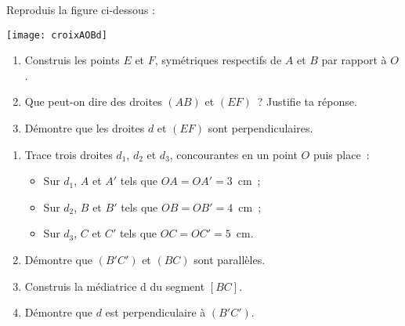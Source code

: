 \begin{exercice}
Reproduis la figure ci-dessous :
\begin{center} \texttt{[image: croixAOBd]} \end{center}
\begin{enumerate}
 \item Construis les points $E$ et $F$, symétriques respectifs de $A$ et $B$ par rapport à $O$.
 \item Que peut-on dire des droites $(AB)$ et $(EF)$ ? Justifie ta réponse.
 \item Démontre que les droites $d$ et $(EF)$ sont perpendiculaires.
 \end{enumerate}
\end{exercice}


\begin{exercice}
\begin{enumerate}
 \item Trace trois droites $d_1$, $d_2$ et $d_3$, concourantes en un point $O$ puis place :
 \begin{itemize}
  \item Sur $d_1$, $A$ et $A'$ tels que $OA = OA' = 3$ cm ;
  \item Sur $d_2$, $B$ et $B'$ tels que $OB = OB' = 4$ cm ;
  \item Sur $d_3$, $C$ et $C'$ tels que $OC = OC' = 5$ cm.
  \end{itemize}
 \item Démontre que $(B'C')$ et $(BC)$ sont parallèles.
 \item Construis la médiatrice d du segment $[BC]$.
 \item Démontre que $d$ est perpendiculaire à $(B'C')$.
 \end{enumerate}
\end{exercice}


